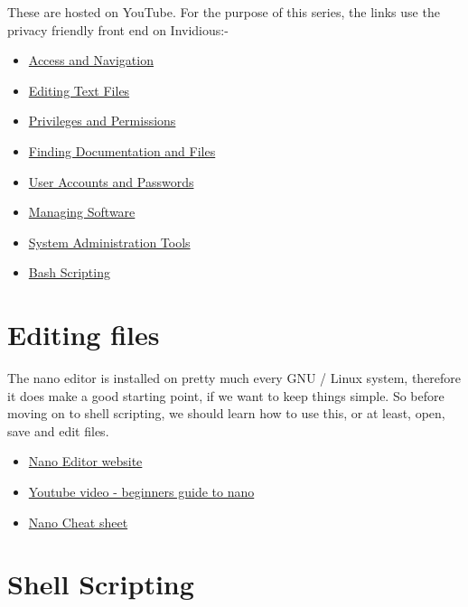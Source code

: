 \documentclass{extbook}
\begin{document}
These are hosted on YouTube. For the purpose of this series, the links use the privacy friendly front end on Invidious:-

\begin{itemize}
\item \href{https://invidious.snopyta.org/watch?v=eH8Z9zeywq0}{Access and Navigation}
\item \href{https://invidious.snopyta.org/watch?v=eH8Z9zeywq0}{Editing Text Files}
\item \href{https://invidious.snopyta.org/watch?v=s23NqWKxOXk}{Privileges and Permissions}
\item \href{https://invidious.snopyta.org/watch?v=4r7V2-EBnR0}{Finding Documentation and Files}
\item \href{https://invidious.snopyta.org/watch?v=XVCf0cou6EU}{User Accounts and Passwords}
\item \href{https://invidious.snopyta.org/watch?v=lNyJllHk2SA}{Managing Software}
\item \href{https://invidious.snopyta.org/watch?v=4\_21KZ3qKEI7}{System Administration Tools}
\item \href{https://invidious.snopyta.org/watch?v=57sp8Y0GL40}{Bash Scripting}
\end{itemize}


\section{Editing files}

The nano editor is installed on pretty much every GNU / Linux system,  therefore it does make a good starting point, if we want to keep things simple. So before moving on to shell scripting, we should learn how to use this, or at least, open, save and edit files.

\begin{itemize}
\item \href{https://www.nano-editor.org/}{Nano Editor website}
\item \href{https://www.youtube.com/watch?v=cLyUZAabf40}{Youtube video - beginners guide to nano}
\item \href{https://www.nano-editor.org/dist/latest/cheatsheet.html}{Nano Cheat sheet}
\end{itemize}

\section{Shell Scripting}
\end{document}
